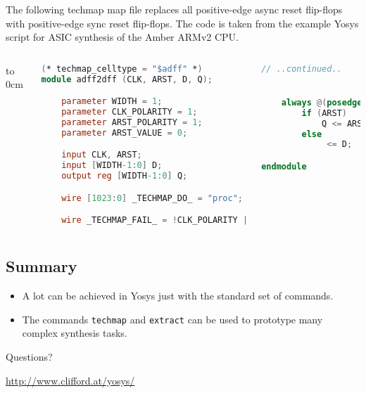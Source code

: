 \begin{frame}[t, fragile]{\subsubsecname}
The following techmap map file replaces all positive-edge async reset flip-flops with
positive-edge sync reset flip-flops. The code is taken from the example Yosys script
for ASIC synthesis of the Amber ARMv2 CPU.

\begin{columns}
\column[t]{6cm}
\vbox to 0cm{
\begin{lstlisting}[basicstyle=\ttfamily\fontsize{8pt}{10pt}\selectfont, language=Verilog]
(* techmap_celltype = "$adff" *)
module adff2dff (CLK, ARST, D, Q);

    parameter WIDTH = 1;
    parameter CLK_POLARITY = 1;
    parameter ARST_POLARITY = 1;
    parameter ARST_VALUE = 0;

    input CLK, ARST;
    input [WIDTH-1:0] D;
    output reg [WIDTH-1:0] Q;

    wire [1023:0] _TECHMAP_DO_ = "proc";

    wire _TECHMAP_FAIL_ = !CLK_POLARITY || !ARST_POLARITY;
\end{lstlisting}
\vss}
\column[t]{4cm}
\begin{lstlisting}[basicstyle=\ttfamily\fontsize{8pt}{10pt}\selectfont, language=Verilog]
// ..continued..


    always @(posedge CLK)
        if (ARST)
            Q <= ARST_VALUE;
        else
             <= D;

endmodule
\end{lstlisting}
\end{columns}

\end{frame}


\subsection{Summary}

\begin{frame}{\subsecname}
\begin{itemize}
\item A lot can be achieved in Yosys just with the standard set of commands.
\item The commands {\tt techmap} and {\tt extract} can be used to prototype many complex synthesis tasks.
\end{itemize}

\bigskip
\bigskip
\begin{center}
Questions?
\end{center}

\bigskip
\bigskip
\begin{center}
\url{http://www.clifford.at/yosys/}
\end{center}
\end{frame}

